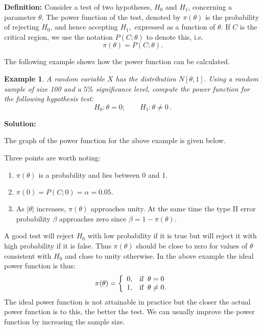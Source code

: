 \documentclass[12pt]{article}
\theoremstyle{break}
\newtheorem{example}[theorem]{Example}
\begin{document}
\textbf{Definition:} Consider a test of two hypotheses, $H_{0}$ and $H_{1}$, concerning a parameter $\theta.$ The power function of the test, denoted by $\pi(\theta)$ is the probability of rejecting $H_{0}$, and hence accepting $H_{1},$ expressed as a function of $\theta.$ If $C$ is the critical region, we use the notation $P(C;\theta)$ to denote this, i.e. $$\pi(\theta)=P(C;\theta).$$

The following example shows how the power function can be calculated.

\begin{example}
A random variable $X$ has the distribution $N[\theta,1].$ Using a random sample of size 100 and a $5\%$ significance level, compute the power function for the following hypothesis test:
$$
H_{0}: \theta=0; \qquad H_{1}: \theta \neq 0\,.
$$
\end{example}

\begin{mdframed}
\bf{Solution:}
\textcolor[rgb]{1.00,1.00,1.00}{\lipsum[1-6]}
\end{mdframed}

The graph of the power function for the above example is given below.


Three points are worth noting:
\begin{enumerate}
\item $\pi(\theta)$ is a probability and lies between 0 and 1.
\item $\pi(0)=P(C;0)=\alpha=0.05.$
\item As $|\theta|$ increases, $\pi(\theta)$ approaches unity. At the same time the type II error probability $\beta$ approaches zero since $\beta=1-\pi(\theta).$
\end{enumerate}

A good test will reject $H_{0}$ with low probability if it is true but will reject it with high probability if it is false. Thus $\pi(\theta)$ should be close to zero for values of $\theta$ consistent with $H_{0}$ and close to unity otherwise. In the above example the ideal power function is thus:
$$\pi(\theta)=\left\{
    \begin{array}{ll}
      0, & \hbox{if}\;\; \theta=0 \\
      1, & \hbox{if}\;\; \theta\neq 0.
    \end{array}
  \right.
$$
The ideal power function is not attainable in practice but the closer the actual power function is to this, the better the test. We can usually improve the power function by increasing the sample size.
\end{document}
